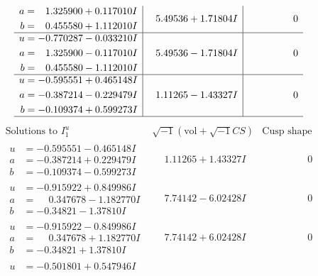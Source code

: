\documentclass[1p]{elsarticle_modified}
\theoremstyle{definition}
\newcommand{\I}{\sqrt{-1}}
\begin{document}
$$\begin{array}{c|c|c}
\begin{aligned}
a &= \phantom{-}1.325900 + 0.117010 I \\
b &= \phantom{-}0.455580 + 1.112010 I\end{aligned}
 & \phantom{-}5.49536 + 1.71804 I & \phantom{-0.000000 } 0 \\ \hline\begin{aligned}
u &= -0.770287 - 0.033210 I \\
a &= \phantom{-}1.325900 - 0.117010 I \\
b &= \phantom{-}0.455580 - 1.112010 I\end{aligned}
 & \phantom{-}5.49536 - 1.71804 I & \phantom{-0.000000 } 0 \\ \hline\begin{aligned}
u &= -0.595551 + 0.465148 I \\
a &= -0.387214 - 0.229479 I \\
b &= -0.109374 + 0.599273 I\end{aligned}
 & \phantom{-}1.11265 - 1.43327 I & \phantom{-0.000000 } 0\\
 \hline 
 \end{array}$$\newpage$$\begin{array}{c|c|c}  
\text{Solutions to }I^u_{1}& \I (\text{vol} + \sqrt{-1}CS) & \text{Cusp shape}\\
 \hline 
\begin{aligned}
u &= -0.595551 - 0.465148 I \\
a &= -0.387214 + 0.229479 I \\
b &= -0.109374 - 0.599273 I\end{aligned}
 & \phantom{-}1.11265 + 1.43327 I & \phantom{-0.000000 } 0 \\ \hline\begin{aligned}
u &= -0.915922 + 0.849986 I \\
a &= \phantom{-}0.347678 - 1.182770 I \\
b &= -0.34821 - 1.37810 I\end{aligned}
 & \phantom{-}7.74142 - 6.02428 I & \phantom{-0.000000 } 0 \\ \hline\begin{aligned}
u &= -0.915922 - 0.849986 I \\
a &= \phantom{-}0.347678 + 1.182770 I \\
b &= -0.34821 + 1.37810 I\end{aligned}
 & \phantom{-}7.74142 + 6.02428 I & \phantom{-0.000000 } 0 \\ \hline\begin{aligned}
u &= -0.501801 + 0.547946 I \\

\end{aligned}
\end{array}$$
\end{document}
